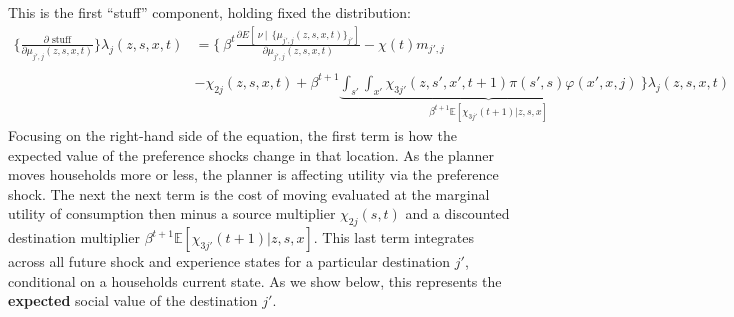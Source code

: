 \documentclass[12pt,pdftex]{article}
\begin{document}
\begin{onehalfspacing}
This is the first ``stuff'' component, holding fixed the distribution:
{\small
\begin{align}
\bigg \{\frac{\partial \mbox{ stuff}}{\partial \mu_{j',j}(z, s,x, t)} \bigg \}\lambda_{j}(z, s, x, t) &= \Bigg \{ \  \beta^{t} \frac{\partial E[\ \nu \ | \ \ \big\{\mu_{j',j}(z,s,x,t)\big\}_{j'}]}{\partial \mu_{j',j}(z,s,x,t)} - \chi(t) m_{j',j} \nonumber \\
\nonumber \\
& - \chi_{2j}(z,s,x,t)  + \beta^{t+1}\underbrace{\int_{s'}\int_{x'}\chi_{3j'}(z,s',x',t+1) \pi(s',s) \varphi(x',x, j)}_{\beta^{t+1}\mathbb{E}\left[\chi_{3j'}(t+1)|z, s, x \right]} \ \Bigg  \} \lambda_{j}(z,s,x,t)
\label{eq:first_stuff_foc}
\end{align}}
Focusing on the right-hand side of the equation, the first term is how the expected value of the preference shocks change in that location. As the planner moves households more or less, the planner is affecting utility via the preference shock. The next the next term is the cost of moving evaluated at the marginal utility of consumption then minus a source multiplier $\chi_{2j}(s,t)$ and a discounted destination multiplier $\beta^{t+1}\mathbb{E}\left[\chi_{3j'}(t+1)|z, s, x \right]$. This last term integrates across all future shock and experience states for a particular destination $j'$, conditional on a households current state. As we show below, this represents the \textbf{expected} social value of the destination $j'$.


\end{onehalfspacing}
\end{document}
